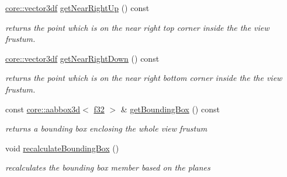 \begin{DoxyCompactItemize}
\hyperlink{namespaceirr_1_1core_ae6e2b2a6c552833ebbd5b7463d03586b}{core\+::vector3df} \hyperlink{structirr_1_1scene_1_1SViewFrustum_a498ea58e0ce6c52e655aa9d7fe387b84}{get\+Near\+Right\+Up} () const
\begin{DoxyCompactList}\small\item\em returns the point which is on the near right top corner inside the the view frustum. \end{DoxyCompactList}\item 
\mbox{\label{structirr_1_1scene_1_1SViewFrustum_a6143916b2000537b33834cfb9aa898fa}} 
\hyperlink{namespaceirr_1_1core_ae6e2b2a6c552833ebbd5b7463d03586b}{core\+::vector3df} \hyperlink{structirr_1_1scene_1_1SViewFrustum_a6143916b2000537b33834cfb9aa898fa}{get\+Near\+Right\+Down} () const
\begin{DoxyCompactList}\small\item\em returns the point which is on the near right bottom corner inside the the view frustum. \end{DoxyCompactList}\item 
\mbox{\label{structirr_1_1scene_1_1SViewFrustum_a4cc58cc7eb251b6911a68c5633acb7f7}} 
const \hyperlink{classirr_1_1core_1_1aabbox3d}{core\+::aabbox3d}$<$ \hyperlink{namespaceirr_a0277be98d67dc26ff93b1a6a1d086b07}{f32} $>$ \& \hyperlink{structirr_1_1scene_1_1SViewFrustum_a4cc58cc7eb251b6911a68c5633acb7f7}{get\+Bounding\+Box} () const
\begin{DoxyCompactList}\small\item\em returns a bounding box enclosing the whole view frustum \end{DoxyCompactList}\item 
\mbox{\label{structirr_1_1scene_1_1SViewFrustum_a458eb19a23bcad50da0f9d3163e3621b}} 
void \hyperlink{structirr_1_1scene_1_1SViewFrustum_a458eb19a23bcad50da0f9d3163e3621b}{recalculate\+Bounding\+Box} ()
\begin{DoxyCompactList}\small\item\em recalculates the bounding box member based on the planes \end{DoxyCompactList}\item 
\mbox{\label{structirr_1_1scene_1_1SViewFrustum_a09f990be73e386e0a2acedf2e647f695}} 

\end{DoxyCompactItemize}
